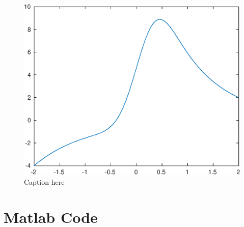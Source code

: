\documentclass{/home/janmebows/Documents/LatexTemplates/myassignment}
\begin{document}
\begin{enumerate}
	\begin{figure}[tb]
		\centering
		\includegraphics{TopicCA3Q2}
		\caption{Caption here}
		\label{fig:q2}
	\end{figure}
\end{enumerate}
\section*{Matlab Code}


\clearpage

\end{document}
